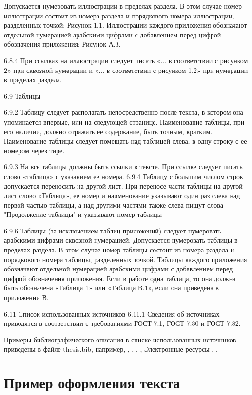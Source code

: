 \documentclass[bachelor, och, coursework]{SCWorks}
\begin{document}
Допускается нумеровать иллюстрации в пределах раздела. В этом случае
номер иллюстрации состоит из номера раздела и порядкового номера иллюстрации, разделенных точкой: Рисунок 1.1.
Иллюстрации каждого приложения обозначают отдельной нумерацией арабскими цифрами с добавлением перед цифрой обозначения приложения: Рисунок
А.3.

6.8.4 При ссылках на иллюстрации следует писать «... в соответствии с
рисунком 2» при сквозной нумерации и «... в соответствии с рисунком 1.2» при
нумерации в пределах раздела.

6.9 Таблицы

6.9.2 Таблицу следует располагать непосредственно после текста, в котором
она упоминается впервые, или на следующей странице.
Наименование таблицы, при его наличии, должно отражать ее содержание,
быть точным, кратким.
Наименование таблицы следует помещать над таблицей слева, в одну строку
с ее номером через тире.

6.9.3 На все таблицы должны быть ссылки в тексте. При ссылке следует
писать слово «таблица» с указанием ее номера.
6.9.4 Таблицу с большим числом строк допускается переносить на другой
лист. При переносе части таблицы на другой лист слово «Таблица», ее номер и
наименование указывают один раз слева над первой частью таблицы, а над
другими частями также слева пишут слова "Продолжение таблицы" и указывают
номер таблицы


6.9.6 Таблицы (за исключением таблиц приложений) следует нумеровать
арабскими цифрами сквозной нумерацией.
Допускается нумеровать таблицы в пределах раздела. В этом случае номер
таблицы состоит из номера раздела и порядкового номера таблицы, разделенных
точкой.
Таблицы каждого приложения обозначают отдельной нумерацией арабскими
цифрами с добавлением перед цифрой обозначения приложения.
Если в работе одна таблица, то она должна быть обозначена «Таблица 1»
или «Таблица B.1», если она приведена в приложении В.


6.11 Список использованных источников
6.11.1 Сведения об источниках приводятся в соответствии с требованиями
ГОСТ 7.1, ГОСТ 7.80 и ГОСТ 7.82.

Примеры библиографического описания в списке использованных источников
приведены в файле thesis.bib, например,
 \cite{Bari_Stechkin-1956}, \cite{Bari-1955}, \cite{Volosivez-2007},  \cite{Golubov_Efimov_Skvorzov},
Электронные ресурсы \cite{MSDN}, \cite{Wiki}.



\section{Пример оформления текста}
\end{document}
